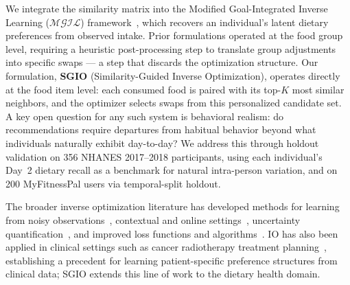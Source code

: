 \documentclass[journal]{IEEEtran}
\newcommand{\MGIL}{\mathcal{MGIL}}
\begin{document}
We integrate the similarity matrix into the Modified Goal-Integrated
Inverse Learning ($\MGIL$) framework~\cite{ahmadi2024IL}, which
recovers an individual's latent dietary preferences from observed intake.
Prior formulations operated at the food group level, requiring a heuristic
post-processing step to translate group adjustments into specific swaps ---
a step that discards the optimization structure. Our formulation,
\textbf{SGIO} (Similarity-Guided Inverse Optimization), operates directly
at the food item level: each consumed food is paired with its top-$K$
most similar neighbors, and the optimizer selects swaps from this
personalized candidate set. A key open question for any such system is
behavioral realism: do recommendations require departures from habitual
behavior beyond what individuals naturally exhibit day-to-day? We address
this through holdout validation on 356 NHANES 2017--2018 participants,
using each individual's Day~2 dietary recall as a benchmark for natural
intra-person variation, and on 200 MyFitnessPal users via temporal-split
holdout.

The broader inverse optimization literature has developed methods for
learning from noisy observations~\cite{aswani2018inverse}, contextual
and online settings~\cite{besbes2023contextual}, uncertainty
quantification~\cite{lin2024conformal}, and improved loss functions and
algorithms~\cite{zattoni2025learning,elmachtoub2022smart}. IO has also
been applied in clinical settings such as cancer radiotherapy treatment
planning~\cite{chan2014generalized}, establishing a precedent for
learning patient-specific preference structures from clinical data;
SGIO extends this line of work to the dietary health domain.
\end{document}
